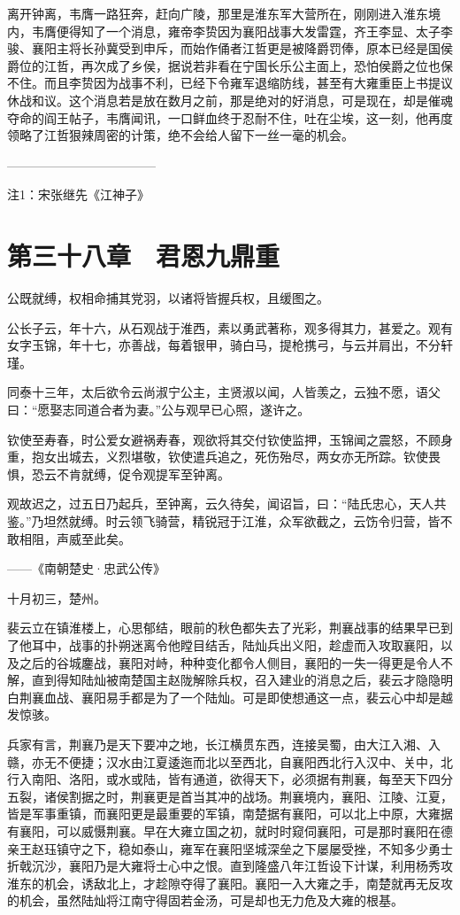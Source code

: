 离开钟离，韦膺一路狂奔，赶向广陵，那里是淮东军大营所在，刚刚进入淮东境内，韦膺便得知了一个消息，雍帝李贽因为襄阳战事大发雷霆，齐王李显、太子李骏、襄阳主将长孙冀受到申斥，而始作俑者江哲更是被降爵罚俸，原本已经是国侯爵位的江哲，再次成了乡侯，据说若非看在宁国长乐公主面上，恐怕侯爵之位也保不住。而且李贽因为战事不利，已经下令雍军退缩防线，甚至有大雍重臣上书提议休战和议。这个消息若是放在数月之前，那是绝对的好消息，可是现在，却是催魂夺命的阎王帖子，韦膺闻讯，一口鲜血终于忍耐不住，吐在尘埃，这一刻，他再度领略了江哲狠辣周密的计策，绝不会给人留下一丝一毫的机会。

————————————

注1：宋张继先《江神子》

\chapter{第三十八章　君恩九鼎重}

公既就缚，权相命捕其党羽，以诸将皆握兵权，且缓图之。

公长子云，年十六，从石观战于淮西，素以勇武著称，观多得其力，甚爱之。观有女字玉锦，年十七，亦善战，每着银甲，骑白马，提枪携弓，与云并肩出，不分轩瑾。

同泰十三年，太后欲令云尚淑宁公主，主贤淑以闻，人皆羡之，云独不愿，语父曰：“愿娶志同道合者为妻。”公与观早已心照，遂许之。

钦使至寿春，时公爱女避祸寿春，观欲将其交付钦使监押，玉锦闻之震怒，不顾身重，抱女出城去，义烈堪敬，钦使遣兵追之，死伤殆尽，两女亦无所踪。钦使畏惧，恐云不肯就缚，促令观提军至钟离。

观故迟之，过五日乃起兵，至钟离，云久待矣，闻诏旨，曰：“陆氏忠心，天人共鉴。”乃坦然就缚。时云领飞骑营，精锐冠于江淮，众军欲截之，云饬令归营，皆不敢相阻，声威至此矣。

——《南朝楚史·忠武公传》

十月初三，楚州。

裴云立在镇淮楼上，心思郁结，眼前的秋色都失去了光彩，荆襄战事的结果早已到了他耳中，战事的扑朔迷离令他瞠目结舌，陆灿兵出义阳，趁虚而入攻取襄阳，以及之后的谷城鏖战，襄阳对峙，种种变化都令人侧目，襄阳的一失一得更是令人不解，直到得知陆灿被南楚国主赵陇解除兵权，召入建业的消息之后，裴云才隐隐明白荆襄血战、襄阳易手都是为了一个陆灿。可是即使想通这一点，裴云心中却是越发惊骇。

兵家有言，荆襄乃是天下要冲之地，长江横贯东西，连接吴蜀，由大江入湘、入赣，亦无不便捷；汉水由江夏逶迤而北以至西北，自襄阳西北行入汉中、关中，北行入南阳、洛阳，或水或陆，皆有通道，欲得天下，必须据有荆襄，每至天下四分五裂，诸侯割据之时，荆襄更是首当其冲的战场。荆襄境内，襄阳、江陵、江夏，皆是军事重镇，而襄阳更是最重要的军镇，南楚据有襄阳，可以北上中原，大雍据有襄阳，可以威慑荆襄。早在大雍立国之初，就时时窥伺襄阳，可是那时襄阳在德亲王赵珏镇守之下，稳如泰山，雍军在襄阳坚城深垒之下屡屡受挫，不知多少勇士折戟沉沙，襄阳乃是大雍将士心中之恨。直到隆盛八年江哲设下计谋，利用杨秀攻淮东的机会，诱敌北上，才趁隙夺得了襄阳。襄阳一入大雍之手，南楚就再无反攻的机会，虽然陆灿将江南守得固若金汤，可是却也无力危及大雍的根基。

